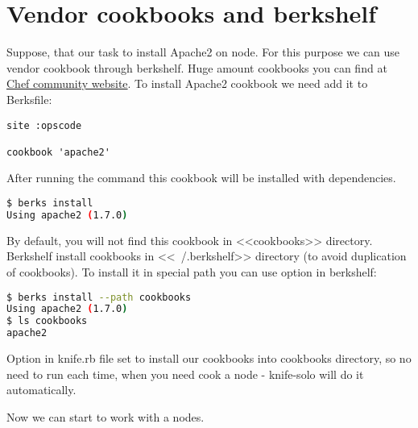 \section{Vendor cookbooks and berkshelf}
\label{sec:solo-berkshelf}

Suppose, that our task to install Apache2 on node. For this purpose we can use vendor cookbook through berkshelf. Huge amount cookbooks you can find at \href{http://community.opscode.com/cookbooks}{Chef community website}. To install Apache2 cookbook we need add it to Berksfile:

\begin{lstlisting}[label=lst:my-cloud-berkshelf1,title=my-cloud/Berksfile]
site :opscode

cookbook 'apache2'
\end{lstlisting}

After running the command  this cookbook will be installed with dependencies.

\begin{lstlisting}[language=Bash,label=lst:my-cloud-berkshelf2]
$ berks install
Using apache2 (1.7.0)
\end{lstlisting}

By default, you will not find this cookbook in <<cookbooks>> directory. Berkshelf install cookbooks in <<~/.berkshelf>> directory (to avoid duplication of cookbooks). To install it in special path you can use  option in berkshelf:

\begin{lstlisting}[language=Bash,label=lst:my-cloud-berkshelf3]
$ berks install --path cookbooks
Using apache2 (1.7.0)
$ ls cookbooks
apache2
\end{lstlisting}

Option  in knife.rb file set to install our cookbooks into cookbooks directory, so no need to run  each time, when you need cook a node - knife-solo will do it automatically.

Now we can start to work with a nodes.
